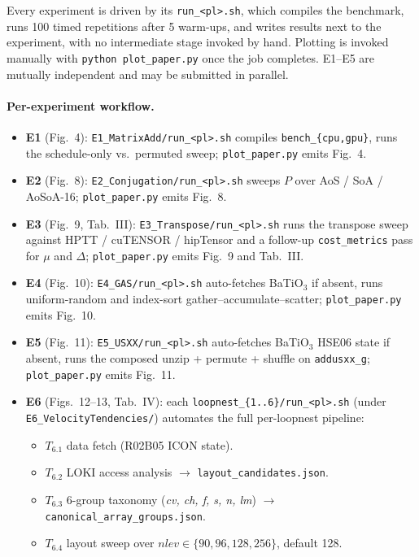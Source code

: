 \documentclass[conference]{IEEEtran}
\begin{document}
\artcomp

Every experiment is driven by its \texttt{run\_<pl>.sh}, which compiles the benchmark, runs 100 timed repetitions after 5 warm-ups, and writes results next to the experiment, with no intermediate stage invoked by hand. Plotting is invoked manually with \texttt{python plot\_paper.py} once the job completes. E1--E5 are mutually independent and may be submitted in parallel.

\paragraph{Per-experiment workflow.}
\begin{itemize}\setlength{\itemsep}{1pt}\setlength{\parsep}{0pt}
\item \textbf{E1} (Fig.~4): \texttt{E1\_MatrixAdd/run\_<pl>.sh} compiles \texttt{bench\_\{cpu,gpu\}}, runs the schedule-only vs.\ permuted sweep; \texttt{plot\_paper.py} emits Fig.~4.
\item \textbf{E2} (Fig.~8): \texttt{E2\_Conjugation/run\_<pl>.sh} sweeps $P$ over AoS / SoA / AoSoA-16; \texttt{plot\_paper.py} emits Fig.~8.
\item \textbf{E3} (Fig.~9, Tab.~III): \texttt{E3\_Transpose/run\_<pl>.sh} runs the transpose sweep against HPTT / cuTENSOR / hipTensor and a follow-up \texttt{cost\_metrics} pass for $\mu$ and $\Delta$; \texttt{plot\_paper.py} emits Fig.~9 and Tab.~III.
\item \textbf{E4} (Fig.~10): \texttt{E4\_GAS/run\_<pl>.sh} auto-fetches BaTiO$_3$ if absent, runs uniform-random and index-sort gather--accumulate--scatter; \texttt{plot\_paper.py} emits Fig.~10.
\item \textbf{E5} (Fig.~11): \texttt{E5\_USXX/run\_<pl>.sh} auto-fetches BaTiO$_3$ HSE06 state if absent, runs the composed unzip + permute + shuffle on \texttt{addusxx\_g}; \texttt{plot\_paper.py} emits Fig.~11.
\item \textbf{E6} (Figs.~12--13, Tab.~IV): each \texttt{loopnest\_\{1..6\}/run\_<pl>.sh} (under \texttt{E6\_VelocityTendencies/}) automates the full per-loopnest pipeline:
  \begin{itemize}\itemsep1pt
  \item $T_{6.1}$ data fetch (R02B05 ICON state).
  \item $T_{6.2}$ LOKI access analysis $\to$ \texttt{layout\_candidates.json}.
  \item $T_{6.3}$ 6-group taxonomy (\textit{cv, ch, f, s, n, lm}) $\to$ \texttt{canonical\_array\_groups.json}.
  \item $T_{6.4}$ layout sweep over $nlev \in \{90, 96, 128, 256\}$, default 128.

\end{itemize}
\end{itemize}
\end{document}
